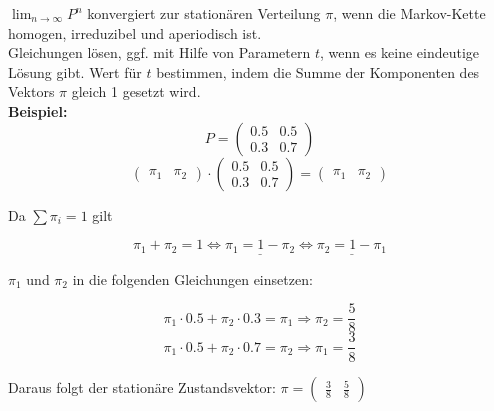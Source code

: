\(\lim_{n\rightarrow\infty} P^n\) konvergiert zur stationären Verteilung \(\pi\), wenn die Markov-Kette homogen, irreduzibel und aperiodisch ist.\\

Gleichungen lösen, ggf. mit Hilfe von Parametern \(t\), wenn es keine eindeutige Lösung gibt. Wert für \(t\) bestimmen, indem die Summe der Komponenten des Vektors \(\pi\) gleich 1 gesetzt wird.\\

\textbf{Beispiel:}
\begin{equation*}
    P = \begin{pmatrix}
        0.5 & 0.5\\
        0.3 & 0.7
    \end{pmatrix}
\end{equation*}
\begin{equation*}
    \begin{pmatrix}
        \pi_1 & \pi_2
    \end{pmatrix} \cdot \begin{pmatrix}
        0.5 & 0.5\\
        0.3 & 0.7
    \end{pmatrix} = \begin{pmatrix}
        \pi_1 & \pi_2
    \end{pmatrix}
\end{equation*}

Da \(\sum \pi_i=1\) gilt

\begin{equation*}
    \pi_1 + \pi_2 = 1 \Leftrightarrow \underline{\pi_1 = 1 - \pi_2} \Leftrightarrow \underline{\pi_2 = 1 - \pi_1}
\end{equation*}

\(\pi_1\) und \(\pi_2\) in die folgenden Gleichungen einsetzen:

\begin{equation*}
    \pi_1 \cdot 0.5 + \pi_2 \cdot 0.3 = \pi_1 \Longrightarrow \pi_2 = \frac{5}{8}
\end{equation*}
\begin{equation*}
    \pi_1 \cdot 0.5 + \pi_2 \cdot 0.7 = \pi_2 \Longrightarrow \pi_1 = \frac{3}{8}
\end{equation*}

Daraus folgt der stationäre Zustandsvektor: \(\pi = \begin{pmatrix}
    \frac{3}{8} & \frac{5}{8}
\end{pmatrix}\)



